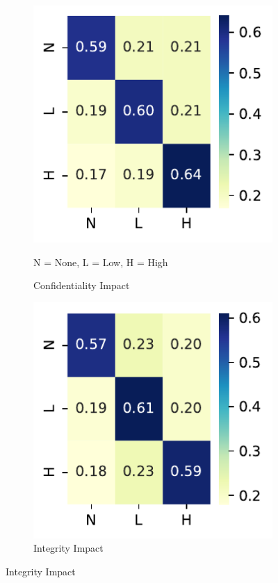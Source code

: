 \documentclass[12pt]{article}
\begin{document}
\begin{figure}
\begin{subfigure}[t]{0.45\textwidth}
		\includegraphics[width=\textwidth]{./figures/confusion_matrices/confidentiality_impact_mitre.pdf}
		\caption{Confidentiality Impact}
		\begin{tablenotes}
			\footnotesize
			\item \quad N = None, L = Low, H = High
		\end{tablenotes}
	\end{subfigure}

	\vspace{1em}

	\begin{subfigure}[t]{0.45\textwidth}
		\includegraphics[width=\textwidth]{./figures/confusion_matrices/integrity_impact_mitre.pdf}
		\caption{Integrity Impact}


\end{subfigure}
\end{figure}
\end{document}
